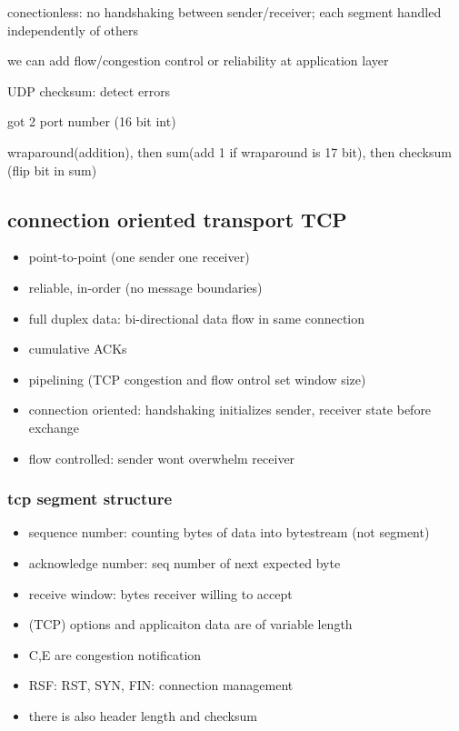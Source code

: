 \documentclass[10pt]{article}
\theoremstyle{break}
\begin{document}
conectionless: no handshaking between sender/receiver; each segment handled independently of others 

we can add flow/congestion control or reliability at application layer 

UDP checksum: detect errors 

got 2 port number (16 bit int)

wraparound(addition), then sum(add 1 if wraparound is 17 bit), then checksum (flip bit in sum)


\subsection{connection oriented transport TCP}
\begin{itemize}
    \item point-to-point (one sender one receiver)
    \item reliable, in-order (no message boundaries)
    \item full duplex data: bi-directional data flow in same connection 
    \item cumulative ACKs 
    \item pipelining (TCP congestion and flow ontrol set window size)
    \item connection oriented: handshaking initializes sender, receiver state before exchange 
    \item flow controlled: sender wont overwhelm receiver
\end{itemize}

\subsubsection{tcp segment structure}
\begin{itemize}
    \item sequence number: counting bytes of data into bytestream (not segment)
    \item acknowledge number: seq number of next expected byte 
    \item receive window: bytes receiver willing to accept 
    \item (TCP) options and applicaiton data are of variable length
    \item C,E are congestion notification 
    \item RSF: RST, SYN, FIN: connection management
    \item there is also header length and checksum
\end{itemize}
\end{document}
